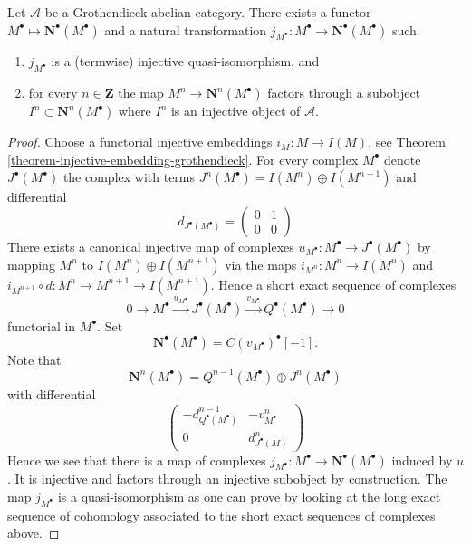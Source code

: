 \begin{lemma}
\label{lemma-functorial-injective}
Let $\mathcal{A}$ be a Grothendieck abelian category.
There exists a functor $M^\bullet \mapsto \mathbf{N}^\bullet(M^\bullet)$
and a natural transformation
$j_{M^\bullet} : M^\bullet \to \mathbf{N}^\bullet(M^\bullet)$
such
\begin{enumerate}
\item $j_{M^\bullet}$ is a (termwise) injective quasi-isomorphism, and
\item for every $n \in \mathbf{Z}$ the map $M^n \to \mathbf{N}^n(M^\bullet)$
factors through a subobject $I^n \subset \mathbf{N}^n(M^\bullet)$ where $I^n$
is an injective object of $\mathcal{A}$.
\end{enumerate}
\end{lemma}

\begin{proof}
Choose a functorial injective embeddings $i_M : M \to I(M)$, see
Theorem \ref{theorem-injective-embedding-grothendieck}.
For every complex $M^\bullet$ denote $J^\bullet(M^\bullet)$ the complex
with terms $J^n(M^\bullet) = I(M^n) \oplus I(M^{n + 1})$ and differential
$$
d_{J^\bullet(M^\bullet)} =
\left(
\begin{matrix}
0 & 1 \\
0 & 0
\end{matrix}
\right)
$$
There exists a canonical injective map of complexes
$u_{M^\bullet} : M^\bullet \to J^\bullet(M^\bullet)$ by mapping $M^n$ to
$I(M^n) \oplus I(M^{n + 1})$ via the maps $i_{M^n} : M^n \to I(M^n)$ and
$i_{M^{n + 1}} \circ d : M^n \to M^{n + 1} \to I(M^{n + 1})$. Hence a
short exact sequence of complexes
$$
0 \to M^\bullet \xrightarrow{u_{M^\bullet}}
J^\bullet(M^\bullet) \xrightarrow{v_{M^\bullet}}
Q^\bullet(M^\bullet) \to 0
$$
functorial in $M^\bullet$. Set
$$
\mathbf{N}^\bullet(M^\bullet) = C(v_{M^\bullet})^\bullet[-1].
$$
Note that
$$
\mathbf{N}^n(M^\bullet) = Q^{n - 1}(M^\bullet) \oplus J^n(M^\bullet)
$$
with differential
$$
\left(
\begin{matrix}
- d^{n - 1}_{Q^\bullet(M^\bullet)} & - v^n_{M^\bullet} \\
0 & d^n_{J^\bullet(M)}
\end{matrix}
\right)
$$
Hence we see that there is a map of complexes
$j_{M^\bullet} : M^\bullet \to \mathbf{N}^\bullet(M^\bullet)$
induced by $u$. It is injective and factors through an injective subobject
by construction. The map $j_{M^\bullet}$ is a quasi-isomorphism as one
can prove by looking at the long exact sequence of cohomology associated
to the short exact sequences of complexes above.
\end{proof}

